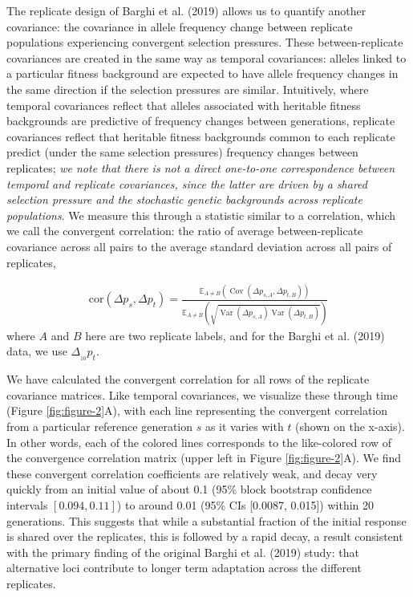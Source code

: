 \documentclass[9pt,twocolumn,twoside]{pnas-new}
\newcommand{\E}{\mathbb{E}}
\DeclareMathOperator{\var}{Var}
\DeclareMathOperator{\cov}{Cov}
\newcommand{\vb}[1]{{\it \color{red} #1}}
\begin{document}
The replicate design of Barghi et al. (2019) allows us to quantify another
covariance: the covariance in allele frequency change between replicate
populations experiencing convergent selection pressures. These
between-replicate covariances are created in the same way as temporal
covariances: alleles linked to a particular fitness background are expected to
have allele frequency changes in the same direction if the selection pressures
are similar. Intuitively, where temporal covariances reflect that alleles
associated with heritable fitness backgrounds are predictive of frequency
changes between generations, replicate covariances reflect that heritable
fitness backgrounds common to each replicate predict (under the same selection
pressures) frequency changes between replicates; \vb{we note that there is not
  a direct one-to-one correspondence between temporal and replicate
  covariances, since the latter are driven by a shared selection pressure and
  the stochastic genetic backgrounds across replicate populations}. We measure
  this through a statistic similar to a correlation, which we call the
  convergent correlation: the ratio of average between-replicate covariance
  across all pairs to the average standard deviation across all pairs of
  replicates, 


\begin{align}
  \label{eq:conv-corr}
  \mathrm{cor}(\Delta p_s, \Delta p_t) = \frac{\E_{A\ne B} \left( \cov(\Delta p_{s,A}, \Delta p_{t,B}) \right)}{\E_{A\ne B} \left( \sqrt{\var(\Delta p_{s,A}) \var(\Delta p_{t,B})} \right)}
\end{align}
%
where $A$ and $B$ here are two replicate labels, and for the
Barghi et al. (2019) data, we use $\Delta_{_{10}} p_t$. 

We have calculated the convergent correlation for all rows of the replicate
covariance matrices. Like temporal covariances, we visualize these through time
(Figure \ref{fig:figure-2}A), with each line representing the convergent
correlation from a particular reference generation $s$ as it varies with $t$
(shown on the x-axis). In other words, each of the colored lines corresponds to
the like-colored row of the convergence correlation matrix (upper left in
Figure \ref{fig:figure-2}A). We find these convergent correlation coefficients
are relatively weak, and decay very quickly from an initial value of about 0.1
(95\% block bootstrap confidence intervals $[0.094, 0.11]$) to around 0.01
(95\% CIs [0.0087, 0.015]) within 20 generations. This suggests that while a
substantial fraction of the initial response is shared over the replicates,
this is followed by a rapid decay, a result consistent with the primary finding
of the original Barghi et al. (2019) study: that alternative loci
contribute to longer term adaptation across the different replicates. 
\end{document}
